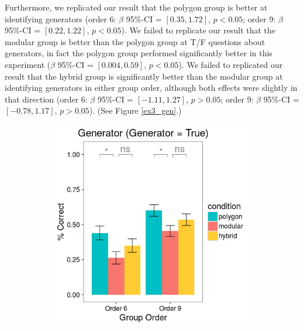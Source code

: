 \documentclass[11pt]{article}
\begin{document}
Furthermore, we replicated our result that the polygon group is better at identifying generators (order 6: $\beta$ 95\%-CI = $[0.35,1.72]$, $p < 0.05$; order 9: $\beta$ 95\%-CI = $[0.22,1.22]$, $p < 0.05$). We failed to replicate our result that the modular group is better than the polygon group at T/F questions about generators, in fact the polygon group performed significantly better in this experiment ($\beta$ 95\%-CI = $[0.004,0.59]$, $p < 0.05$). We failed to replicated our result that the hybrid group is significantly better than the modular group at identifying generators in either group order, although both effects were slightly in that direction (order 6: $\beta$ 95\%-CI = $[-1.11,1.27]$, $p > 0.05$; order 9: $\beta$ 95\%-CI = $[-0.78, 1.17]$, $p > 0.05$). (See Figure \ref{ex3_gen}.)
\begin{figure}[H]
\centering
\begin{subfigure}[c]{0.4\textwidth}
\centering
\includegraphics[width=\textwidth]{figures/3/gen_T_r.png}
\end{subfigure}
~
\begin{subfigure}[c]{0.4\textwidth}
\centering

\end{subfigure}
\end{figure}
\end{document}

